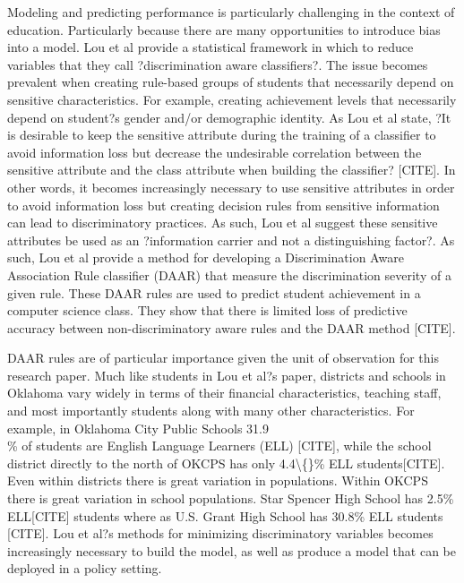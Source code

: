 \documentclass[12pt,a4paper]{article}
\begin{document}
Modeling and predicting performance is particularly challenging in the context of education. Particularly because there are many opportunities to introduce bias into a model. Lou et al provide a statistical framework in which to reduce variables that they call ?discrimination aware classifiers?. The issue becomes prevalent when creating rule-based groups of students that necessarily depend on sensitive characteristics. For example, creating achievement levels that necessarily depend on student?s gender and/or demographic identity. As Lou et al state, ?It is desirable to keep the sensitive attribute during the training of a classifier to avoid information loss but decrease the undesirable correlation between the sensitive attribute and the class attribute when building the classifier? [CITE]. In other words, it becomes increasingly necessary to use sensitive attributes in order to avoid information loss but creating decision rules from sensitive information can lead to discriminatory practices. As such, Lou et al suggest these sensitive attributes be used as an ?information carrier and not a distinguishing factor?.  As such, Lou et al provide a method for developing a Discrimination Aware Association Rule classifier (DAAR) that measure the discrimination severity of a given rule. These DAAR rules are used to predict student achievement in a computer science class. They show that there is limited loss of predictive accuracy between non-discriminatory aware rules and the DAAR method [CITE].

DAAR rules are of particular importance given the unit of observation for this research paper. Much like students in Lou et al?s paper, districts and schools in Oklahoma vary widely in terms of their financial characteristics, teaching staff, and most importantly students along with many other characteristics. For example, in Oklahoma City Public Schools 31.9\\\% of students are English Language Learners (ELL) [CITE], while the school district directly to the north of OKCPS has only 4.4\textbackslash\{\}\% ELL students[CITE]. Even within districts there is great variation in populations. Within OKCPS there is great variation in school populations. Star Spencer High School has 2.5\% ELL[CITE] students where as U.S. Grant High School has 30.8\% ELL students [CITE]. Lou et al?s methods for minimizing discriminatory variables becomes increasingly necessary to build the model, as well as produce a model that can be deployed in a policy setting. 
\end{document}
